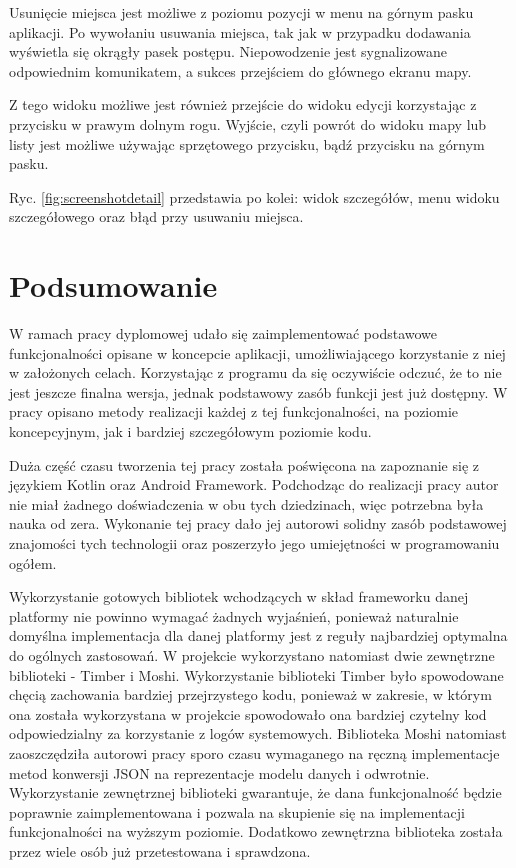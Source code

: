 \documentclass[polish,polish,a4paper,12pt]{article}
\let\sectioncmd\section
\renewcommand{\section}{\clearpage\sectioncmd}
\begin{document}
	Usunięcie miejsca jest możliwe z poziomu pozycji w menu na górnym pasku aplikacji. Po wywołaniu usuwania miejsca, tak jak w przypadku dodawania wyświetla się okrągły pasek postępu. Niepowodzenie jest sygnalizowane odpowiednim komunikatem, a sukces przejściem do głównego ekranu mapy.

	Z tego widoku możliwe jest również przejście do widoku edycji korzystając z przycisku w prawym dolnym rogu. Wyjście, czyli powrót do widoku mapy lub listy jest możliwe używając sprzętowego przycisku, bądź przycisku na górnym pasku.

	Ryc. \ref{fig:screenshotdetail} przedstawia po kolei: widok szczegółów, menu widoku szczegółowego oraz błąd przy usuwaniu miejsca.

\section{Podsumowanie}\label{summary}

W ramach pracy dyplomowej udało się zaimplementować podstawowe funkcjonalności opisane w koncepcie aplikacji, umożliwiającego korzystanie z niej w założonych celach. Korzystając z programu da się oczywiście odczuć, że to nie jest jeszcze finalna wersja, jednak podstawowy zasób funkcji jest już dostępny. W pracy opisano metody realizacji każdej z tej funkcjonalności, na poziomie koncepcyjnym, jak i bardziej szczegółowym poziomie kodu.

Duża część czasu tworzenia tej pracy została poświęcona na zapoznanie się z językiem Kotlin oraz Android Framework. Podchodząc do realizacji pracy autor nie miał żadnego doświadczenia w obu tych dziedzinach, więc potrzebna była nauka od zera. Wykonanie tej pracy dało jej autorowi solidny zasób podstawowej znajomości tych technologii oraz poszerzyło jego umiejętności w programowaniu ogółem.

Wykorzystanie gotowych bibliotek wchodzących w skład frameworku danej platformy nie powinno wymagać żadnych wyjaśnień, ponieważ naturalnie domyślna implementacja dla danej platformy jest z reguły najbardziej optymalna do ogólnych zastosowań. W projekcie wykorzystano natomiast dwie zewnętrzne biblioteki - Timber i Moshi. Wykorzystanie biblioteki Timber było spowodowane chęcią zachowania bardziej przejrzystego kodu, ponieważ w zakresie, w którym ona została wykorzystana w projekcie spowodowało ona bardziej czytelny kod odpowiedzialny za korzystanie z logów systemowych. Biblioteka Moshi natomiast zaoszczędziła autorowi pracy sporo czasu wymaganego na ręczną implementacje metod konwersji JSON na reprezentacje modelu danych i odwrotnie. Wykorzystanie zewnętrznej biblioteki gwarantuje, że dana funkcjonalność będzie poprawnie zaimplementowana i pozwala na skupienie się na implementacji funkcjonalności na wyższym poziomie. Dodatkowo zewnętrzna biblioteka została przez wiele osób już przetestowana i sprawdzona.
\end{document}

